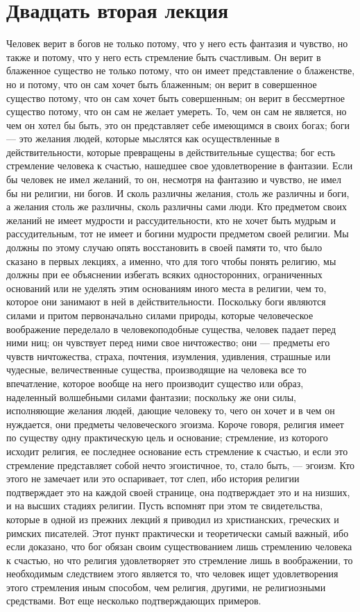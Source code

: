\documentclass[12pt]{article}
\begin{document}
\section*{Двадцать вторая лекция}

Человек верит в богов не только потому, что у него есть фантазия и чувство, но также и потому, что у него есть стремление быть счастливым. Он верит в блаженное существо не только потому, что он имеет представление о блаженстве, но и потому, что он сам хочет быть блаженным; он верит в совершенное существо потому, что он сам хочет быть совершенным; он верит в бессмертное существо потому, что он сам не желает умереть. То, чем он сам не является, но чем он хотел бы быть, это он представляет себе имеющимся в своих богах; боги --- это желания людей, которые мыслятся как осуществленные в действительности, которые превращены в действительные существа; бог есть стремление человека к счастью, нашедшее свое удовлетворение в фантазии. Если бы человек не имел желаний, то он, несмотря на фантазию и чувство, не имел бы ни религии, ни богов. И сколь различны желания, столь же различны и боги, а желания столь же различны, сколь различны сами люди. Кто предметом своих желаний не имеет мудрости и рассудительности, кто не хочет быть мудрым и рассудительным, тот не имеет и богини мудрости предметом своей религии. Мы должны по этому случаю опять восстановить в своей памяти то, что было сказано в первых лекциях, а именно, что для того чтобы понять религию, мы должны при ее объяснении избегать всяких односторонних, ограниченных оснований или не уделять этим основаниям иного места в религии, чем то, которое они занимают в ней в действительности. Поскольку боги являются силами и притом первоначально силами природы, которые человеческое воображение переделало в человекоподобные существа, человек падает перед ними ниц; он чувствует перед ними свое ничтожество; они --- предметы его чувств ничтожества, страха, почтения, изумления, удивления, страшные или чудесные, величественные существа, производящие на человека все то впечатление, которое вообще на него производит существо или образ, наделенный волшебными силами фантазии; поскольку же они силы, исполняющие желания людей, дающие человеку то, чего он хочет и в чем он нуждается, они предметы человеческого эгоизма. Короче говоря, религия имеет по существу одну практическую цель и основание; стремление, из которого исходит религия, ее последнее основание есть стремление к счастью, и если это стремление представляет собой нечто эгоистичное, то, стало быть, --- эгоизм. Кто этого не замечает или это оспаривает, тот слеп, ибо история религии подтверждает это на каждой своей странице, она подтверждает это и на низших, и на высших стадиях религии. Пусть вспомнят при этом те свидетельства, которые в одной из прежних лекций я приводил из христианских, греческих и римских писателей. Этот пункт практически и теоретически самый важный, ибо если доказано, что бог обязан своим существованием лишь стремлению человека к счастью, но что религия удовлетворяет это стремление лишь в воображении, то необходимым следствием этого является то, что человек ищет удовлетворения этого стремления иным способом, чем религия, другими, не религиозными средствами. Вот еще несколько подтверждающих примеров. 
\end{document}
